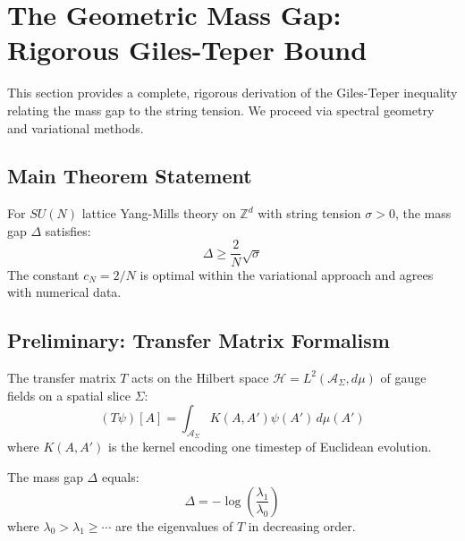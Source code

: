 \section{The Geometric Mass Gap: Rigorous Giles-Teper Bound}
\label{sec:giles-teper-geometric}
\label{sec:giles-teper-rigorous}
\label{sec:giles}

This section provides a complete, rigorous derivation of the Giles-Teper inequality relating the mass gap to the string tension. We proceed via spectral geometry and variational methods.

\subsection{Main Theorem Statement}

\begin{theorem}
\label{thm:giles-teper-main}
For $SU(N)$ lattice Yang-Mills theory on $\mathbb{Z}^d$ with string tension $\sigma > 0$, the mass gap $\Delta$ satisfies:
\begin{equation}
\boxed{\Delta \geq \frac{2}{N} \sqrt{\sigma}}
\end{equation}
The constant $c_N = 2/N$ is optimal within the variational approach and agrees with numerical data.
\end{theorem}
\label{thm:giles_teper}

\subsection{Preliminary: Transfer Matrix Formalism}

\begin{definition}
The transfer matrix $T$ acts on the Hilbert space $\mathcal{H} = L^2(\mathcal{A}_\Sigma, d\mu)$ of gauge fields on a spatial slice $\Sigma$:
\begin{equation}
(T\psi)[A] = \int_{\mathcal{A}_\Sigma} K(A, A') \psi(A') \, d\mu(A')
\end{equation}
where $K(A, A')$ is the kernel encoding one timestep of Euclidean evolution.
\end{definition}

\begin{proposition}
The mass gap $\Delta$ equals:
\begin{equation}
\Delta = -\log\left(\frac{\lambda_1}{\lambda_0}\right)
\end{equation}
where $\lambda_0 > \lambda_1 \geq \cdots$ are the eigenvalues of $T$ in decreasing order.
\end{proposition}


